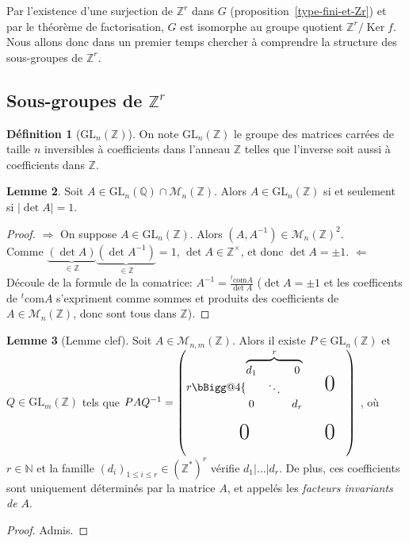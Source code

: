 \documentclass{report}
\makeatletter
\newcommand{\Q}{\mathbb{Q}}
\newcommand{\Z}{\mathbb{Z}}
\newcommand{\N}{\mathbb{N}}
\renewcommand{\ker}{\mathop{\mathrm{Ker}}\nolimits}
\newcommand{\direct}{\textcircled{$\Rightarrow$} }
\newcommand{\reciproque}{\textcircled{$\Leftarrow$} }
\newcommand{\x}{\times}
\theoremstyle{definition}
\newtheorem{defi}{Définition}[chapter]
\newtheorem{lem}[defi]{Lemme}
\theoremstyle{remark}
\newcommand{\biggg}{\bBigg@{4}}
\makeatother
\begin{document}
Par l'existence d'une surjection de $\Z^r$ dans $G$ (proposition~\ref{type-fini-et-Zr}) et par le théorème de factorisation, $G$ est isomorphe au groupe quotient $\Z^r/\ker f$. Nous allons donc dans un premier temps chercher à comprendre la structure des sous-groupes de $\Z^r$.

\subsection{Sous-groupes de $\Z^r$}

\begin{defi}[$\textrm{GL}_n(\Z)$]
On note $\textrm{GL}_n(\Z)$ le groupe des matrices carrées de taille $n$ inversibles à coefficients dans l'anneau $\Z$ telles que l'inverse soit aussi à coefficients dans $\Z$.
\end{defi}

\begin{lem}
Soit $A \in \textrm{GL}_n(\Q) \cap \mathcal{M}_n(\Z)$. Alors $A \in \textrm{GL}_n(\Z)$ si et seulement si $\vert \det A \vert =1$.
\end{lem}
\begin{proof}
\direct On suppose $A \in \textrm{GL}_n(\Z)$. Alors $(A, A^{-1}) \in \mathcal{M}_n(\Z)^2$.\\
Comme $\underbrace{(\det A)}_{\in \Z}\underbrace{(\det A^{-1})}_{\in \Z}=1$, $\det A\in\Z^\x$, et donc $\det A=\pm 1$.\smallbreak
\reciproque D\'ecoule de la formule de la comatrice: $A^{-1}=\frac{^t\textrm{com}A}{\det A}$ ($\det A=\pm 1$ et les coefficents de $^t\textrm{com}A$ s'expriment comme sommes et produits des coefficients de $A\in \mathcal{M}_n(\Z)$, donc sont tous dans $\Z$).
\end{proof}

\begin{lem}[Lemme clef]\label{lemme-clef}
Soit $A \in \mathcal{M}_{n,m}(\Z)$. Alors il existe $P \in \textrm{GL}_n(\Z)$ et $Q \in \textrm{GL}_m(\Z)$ tels que $PAQ^{-1}=
\begin{pmatrix}
	r\biggg\{\overbrace{
		\begin{matrix}d_1&&0\\
	  	&\ddots\\
      	0&&d_r\end{matrix}
	}^{r} && \text{\huge0}&\\
	&\\
    \text{\huge0} && \text{\huge0}\\
	&
\end{pmatrix}$
, où $ r \in \N$ et la famille $(d_i)_{1 \leqslant i \leqslant r} \in (\Z^*)^r$ vérifie $d_1 \vert \ldots \vert d_r$. De plus, ces coefficients sont uniquement déterminés par la matrice $A$, et appelés les \textit{facteurs invariants de $A$}.
\end{lem}
\begin{proof}
Admis.
\end{proof}
\end{document}
